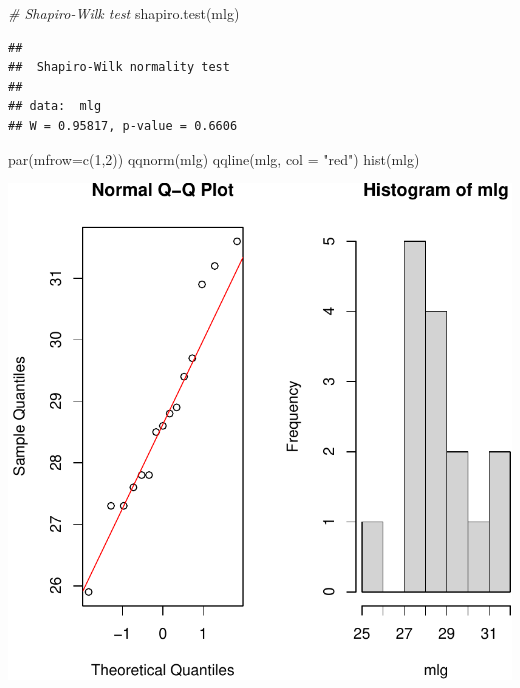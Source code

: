 \documentclass[
]{article}
\newcommand{\AttributeTok}[1]{\textcolor[rgb]{0.77,0.63,0.00}{#1}}
\newcommand{\CommentTok}[1]{\textcolor[rgb]{0.56,0.35,0.01}{\textit{#1}}}
\newcommand{\DecValTok}[1]{\textcolor[rgb]{0.00,0.00,0.81}{#1}}
\newcommand{\FunctionTok}[1]{\textcolor[rgb]{0.00,0.00,0.00}{#1}}
\newcommand{\NormalTok}[1]{#1}
\newcommand{\StringTok}[1]{\textcolor[rgb]{0.31,0.60,0.02}{#1}}
\begin{document}
\begin{Highlighting}[]
\CommentTok{\# Shapiro{-}Wilk test}
\FunctionTok{shapiro.test}\NormalTok{(mlg) }
\end{Highlighting}

\begin{verbatim}
## 
##  Shapiro-Wilk normality test
## 
## data:  mlg
## W = 0.95817, p-value = 0.6606
\end{verbatim}

\begin{Highlighting}[]
\FunctionTok{par}\NormalTok{(}\AttributeTok{mfrow=}\FunctionTok{c}\NormalTok{(}\DecValTok{1}\NormalTok{,}\DecValTok{2}\NormalTok{))}
\FunctionTok{qqnorm}\NormalTok{(mlg)}
\FunctionTok{qqline}\NormalTok{(mlg, }\AttributeTok{col =} \StringTok{"red"}\NormalTok{)}
\FunctionTok{hist}\NormalTok{(mlg)}
\end{Highlighting}

\begin{center}\includegraphics[width=1\linewidth,height=1\textheight]{unnamed-chunk-53-1} \end{center}

\pagebreak
\end{document}
